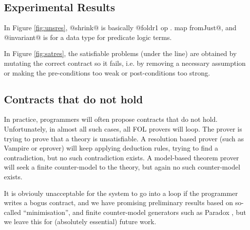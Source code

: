 \subsection{Experimental Results}



In Figure \ref{fig:unsres}, @shrink@ is basically
@foldr1 op . map fromJust@, and @invariant@ is for a data type
for predicate logic terms.

In Figure \ref{fig:satres}, the satisfiable problems (under the line) are
obtained by mutating the correct contract so it fails, i.e.  by
removing a necessary assumption or making the pre-conditions too weak
or post-conditions too strong.


\subsection{Contracts that do not hold}

In practice, programmers will often propose contracts that do not hold.
Unfortunately, in almost all such cases, all FOL provers will loop.
The prover is trying to prove that a theory is unsatisfiable.  A resolution
based prover (such as Vampire or eprover) will keep applying deduction rules, 
trying to find a contradiction, but no such contradiction exists.  A
model-based theorem prover will seek a finite counter-model to the theory, but
again no such counter-model exists. 

It is obviouly unacceptable for the system to go into a loop if
the programmer writes a bogus contract, and we have promising
preliminary results based on so-called ``minimisation'', and 
finite counter-model generators such as Paradox \cite{koen}, but we 
leave this for (absolutely essential) future work.

